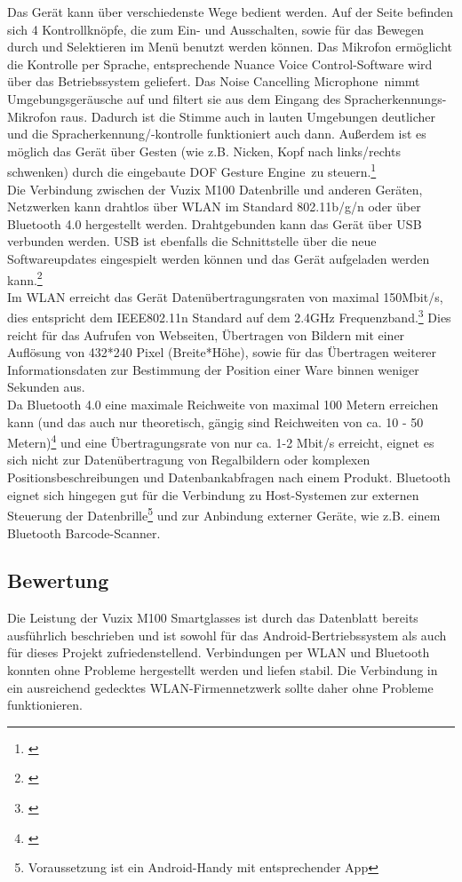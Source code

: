 Das Gerät kann über verschiedenste Wege bedient werden. Auf der Seite befinden sich 4 Kontrollknöpfe, die zum Ein- und Ausschalten, sowie für das Bewegen durch und Selektieren im Menü benutzt werden können. Das Mikrofon ermöglicht die Kontrolle per Sprache, entsprechende \glqq Nuance Voice Control\grqq -Software wird über das Betriebssystem geliefert. Das \glqq Noise Cancelling Microphone\grqq\ nimmt Umgebungsgeräusche auf und filtert sie aus dem Eingang des Spracherkennungs-Mikrofon raus. Dadurch ist die Stimme auch in lauten Umgebungen deutlicher und die Spracherkennung/-kontrolle funktioniert auch dann. Außerdem ist es möglich das Gerät über Gesten (wie z.B. Nicken, Kopf nach links/rechts schwenken) durch die eingebaute  DOF Gesture Engine\grqq\ zu steuern.\footnote{\citep{vuzixm100}}\\

Die Verbindung zwischen der Vuzix M100 Datenbrille und anderen Geräten, Netzwerken kann drahtlos über WLAN im Standard 802.11b/g/n oder über Bluetooth 4.0 hergestellt werden. Drahtgebunden kann das Gerät über USB verbunden werden. \ac{USB} ist ebenfalls die Schnittstelle über die neue Softwareupdates eingespielt werden können und das Gerät aufgeladen werden kann.\footnote{\citep{vuzixm100}}\\
Im \ac{WLAN} erreicht das Gerät Datenübertragungsraten von maximal 150Mbit/s, dies entspricht dem IEEE802.11n Standard auf dem 2.4GHz Frequenzband.\footnote{\citep{uebertragungsgeschwindigkeit}} Dies reicht für das Aufrufen von Webseiten, Übertragen von Bildern mit einer Auflösung von 432*240 Pixel (Breite*Höhe), sowie für das Übertragen weiterer Informationsdaten zur Bestimmung der Position einer Ware binnen weniger Sekunden aus.\\
Da Bluetooth 4.0 eine maximale Reichweite von maximal 100 Metern erreichen kann (und das auch nur theoretisch, gängig sind Reichweiten von ca. 10 - 50 Metern)\footnote{\citep{bluetooth}} und eine Übertragungsrate von nur ca. 1-2 Mbit/s erreicht, eignet es sich nicht zur Datenübertragung von Regalbildern oder komplexen Positionsbeschreibungen und Datenbankabfragen nach einem Produkt. Bluetooth eignet sich hingegen gut für die Verbindung zu Host-Systemen zur externen Steuerung der Datenbrille\footnote{Voraussetzung ist ein Android-Handy mit entsprechender App} und zur Anbindung externer Geräte, wie z.B. einem Bluetooth Barcode-Scanner.

\subsection{Bewertung}
Die Leistung der Vuzix M100 Smartglasses ist durch das Datenblatt bereits ausführlich beschrieben und ist sowohl für das Android-Bertriebssystem als auch für dieses Projekt zufriedenstellend. Verbindungen per \ac{WLAN} und Bluetooth konnten ohne Probleme hergestellt werden und liefen stabil. Die Verbindung in ein ausreichend gedecktes \ac{WLAN}-Firmennetzwerk sollte daher ohne Probleme funktionieren.\\

